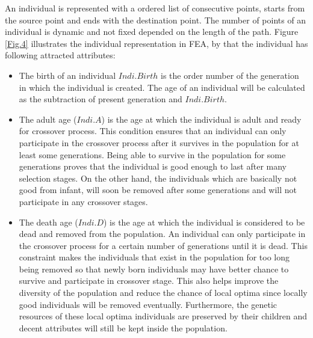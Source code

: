 \documentclass[final]{elsarticle}
\begin{document}
An individual is represented with a ordered list of consecutive points, starts from the source point and ends with the destination point. The number of points of an individual is dynamic and not fixed depended on the length of the path. Figure \ref{Fig.4} illustrates the individual representation in FEA, by that the individual has following attracted attributes: \\
\begin{itemize}
	\item The birth of an individual $Indi.Birth$ is the order number of the generation in which the individual is created. The age of an individual will be calculated as the subtraction of present generation and $Indi.Birth$.
	\item The adult age ($Indi.A$) is the age at which the individual is adult and ready for crossover process. This condition ensures that an individual can only participate in the crossover process after it survives in the population for at least some generations. Being able to survive in the population for some generations proves that the individual is good enough to last after many selection stages. On the other hand, the individuals which are basically not good from infant, will soon be removed after some generations and will not participate in any crossover stages.
	\item The death age ($Indi.D$) is the age at which the individual is considered to be dead and removed from the population. An individual can only participate in the crossover process for a certain number of generations until it is dead. This constraint makes the individuals that exist in the population for too long being removed so that newly born individuals may have better chance to survive and participate in crossover stage. This also helps improve the diversity of the population and reduce the chance of local optima since locally good individuals will be removed eventually. Furthermore, the genetic resources of these local optima individuals are preserved by their children and decent attributes will still be kept inside the population.
\end{itemize}
\end{document}
